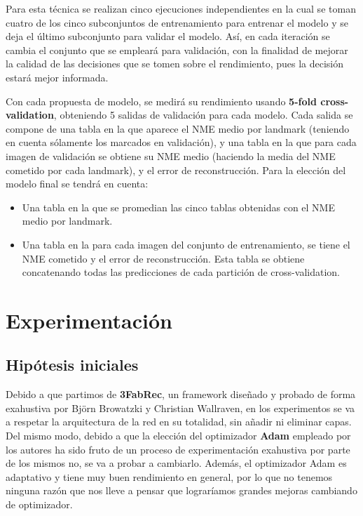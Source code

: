         \medskip

        \noindent Para esta técnica se realizan cinco ejecuciones independientes en la cual se toman cuatro de los cinco subconjuntos de entrenamiento para entrenar el modelo y se deja el último subconjunto para validar el modelo. Así, en cada iteración se cambia el conjunto que se empleará para validación, con la finalidad de mejorar la calidad de las decisiones que se tomen sobre el rendimiento, pues la decisión estará mejor informada.

        \medskip

        \noindent Con cada propuesta de modelo, se medirá su rendimiento usando \textbf{5-fold cross-validation}, obteniendo 5 salidas de validación para cada modelo. Cada salida se compone de una tabla en la que aparece el NME medio por landmark (teniendo en cuenta sólamente los marcados en validación), y una tabla en la que para cada imagen de validación se obtiene su NME medio (haciendo la media del NME cometido por cada landmark), y el error de reconstrucción. Para la elección del modelo final se tendrá en cuenta: 

        \begin{itemize}
            \item Una tabla en la que se promedian las cinco tablas obtenidas con el NME medio por landmark.
            \item Una tabla en la para cada imagen del conjunto de entrenamiento, se tiene el NME cometido y el error de reconstrucción. Esta tabla se obtiene concatenando todas las predicciones de cada partición de cross-validation.
        \end{itemize}


\section{Experimentación}
    \subsection{Hipótesis iniciales}
        \noindent Debido a que partimos de \textbf{3FabRec}, un framework diseñado y probado de forma exahustiva por Björn Browatzki y Christian Wallraven, en los experimentos se va a respetar la arquitectura de la red en su totalidad, sin añadir ni eliminar capas. Del mismo modo, debido a que la elección del optimizador \textbf{Adam} empleado por los autores ha sido fruto de un proceso de experimentación exahustiva por parte de los mismos no, se va a probar a cambiarlo. Además, el optimizador Adam es adaptativo y tiene muy buen rendimiento en general, por lo que no tenemos ninguna razón que nos lleve a pensar que lograríamos grandes mejoras cambiando de optimizador.

